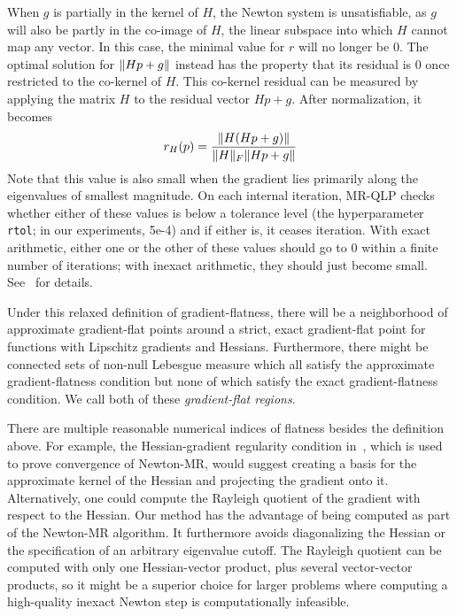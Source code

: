 \documentclass[../../thesis.tex]{subfiles}
\begin{document}
When $g$ is partially in the kernel of $H$,
the Newton system is unsatisfiable,
as $g$ will also be partly in the co-image of $H$,
the linear subspace into which $H$ cannot map any vector.
In this case, the minimal value for $r$ will no longer be $0$.
The optimal solution for $\lVert Hp + g\rVert$
instead has the property that its residual
is $0$ once restricted to the co-kernel of $H$.
This co-kernel residual can be measured by applying the matrix $H$
to the residual vector $Hp + g$.
After normalization, it becomes
\begin{equation}
    r_H(p) = \frac{\lVert H(Hp + g)\rVert}{\lVert H\rVert_F \lVert Hp + g\rVert}
\end{equation}
\noindent Note that this value is also small when the gradient lies
primarily along the eigenvalues of smallest magnitude.
On each internal iteration, MR-QLP checks whether
either of these values is below a tolerance level
(the hyperparameter \texttt{rtol}; in our experiments, 5e-4)
and if either is, it ceases iteration.
With exact arithmetic,
either one or the other of these values
should go to 0 within a finite number of iterations;
with inexact arithmetic, they should just become small.
See~\cite{choi2011} for details.

Under this relaxed definition of gradient-flatness,
there will be a neighborhood of approximate gradient-flat points
around a strict, exact gradient-flat point
for functions with Lipschitz gradients and Hessians.
Furthermore, there might be connected sets of non-null Lebesgue measure
which all satisfy the approximate gradient-flatness condition
but none of which satisfy the exact gradient-flatness condition.
We call both of these \emph{gradient-flat regions}.

There are multiple reasonable numerical indices of flatness besides
the definition above.
For example,
the Hessian-gradient regularity condition in~\cite{roosta2018},
which is used to prove convergence of Newton-MR,
would suggest creating a basis for the approximate kernel of the Hessian
and projecting the gradient onto it.
Alternatively, one could compute the Rayleigh quotient
of the gradient with respect to the Hessian.
Our method has the advantage of being computed as part of the Newton-MR algorithm.
It furthermore avoids diagonalizing the Hessian or the specification
of an arbitrary eigenvalue cutoff.
The Rayleigh quotient can be computed with only one Hessian-vector product,
plus several vector-vector products,
so it might be a superior choice for larger problems where
computing a high-quality inexact Newton step is computationally infeasible.
\end{document}
